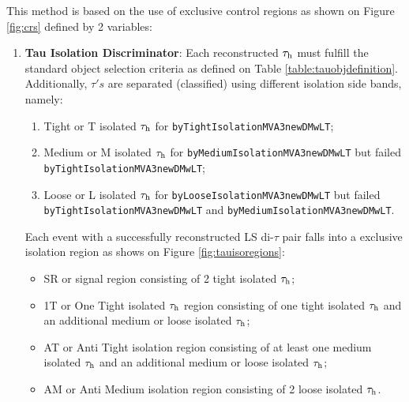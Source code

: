 This method is based on the use of exclusive control regions as shown on Figure \ref{fig:crs} defined by 2 variables:

\begin{enumerate}
	\item \textbf{Tau Isolation Discriminator}: Each reconstructed $\tau_{\text{h}}$ must fulfill the standard object selection criteria as defined on Table \ref{table:tauobjdefinition}. Additionally, $\tau's$ are separated (classified) using different isolation side bands, namely:
	
	\begin{enumerate}
		\item Tight or T isolated $\tau_{\text{h}}$ for \texttt{byTight\-IsolationMVA3newDMwLT};
		\item Medium or M isolated $\tau_{\text{h}}$ for \texttt{byMedium\-IsolationMVA3newDMwLT} but failed \texttt{byTight\-IsolationMVA3newDMwLT};
		\item Loose or L isolated $\tau_{\text{h}}$  for \texttt{byLoose\-IsolationMVA3newDMwLT} but failed \texttt{byTight\-IsolationMVA3newDMwLT} and \texttt{byMedium\-IsolationMVA3newDMwLT}.
	\end{enumerate}
	Each event with a successfully reconstructed LS di-$\tau$ pair falls into a exclusive isolation region as shows on Figure \ref{fig:tauisoregions}:
	
	\begin{itemize}
		\item SR or signal region consisting of 2 tight isolated $\tau_{\text{h}}$;
		\item 1T or One Tight isolated $\tau_{\text{h}}$ region consisting of one tight isolated $\tau_{\text{h}}$ and an additional medium or loose isolated $\tau_{\text{h}}$;
		\item AT or Anti Tight isolation region consisting of at least one medium isolated $\tau_{\text{h}}$ and an additional medium or loose isolated $\tau_{\text{h}}$;
		\item AM or Anti Medium isolation region consisting of 2 loose isolated $\tau_{\text{h}}$.
	\end{itemize}
	

\end{enumerate}
